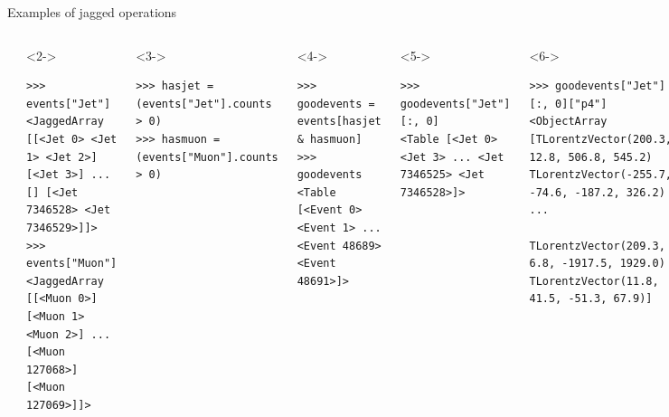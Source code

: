 \documentclass[aspectratio=169]{beamer}
\begin{document}
\begin{frame}[fragile]{Examples of jagged operations}
\scriptsize
\begin{columns}
\begin{verbatim}
>>> events
<Table [<Event 0> <Event 1> ... <Event 99998> <Event 99999>]>
\end{verbatim}
\begin{uncoverenv}<2->
\begin{verbatim}
>>> events["Jet"]
<JaggedArray [[<Jet 0> <Jet 1> <Jet 2>] [<Jet 3>] ... [] [<Jet 7346528> <Jet 7346529>]]>
>>> events["Muon"]
<JaggedArray [[<Muon 0>] [<Muon 1> <Muon 2>] ... [<Muon 127068>] [<Muon 127069>]]>
\end{verbatim}
\end{uncoverenv}
\begin{uncoverenv}<3->
\begin{verbatim}
>>> hasjet = (events["Jet"].counts > 0)
>>> hasmuon = (events["Muon"].counts > 0)
\end{verbatim}
\end{uncoverenv}
\begin{uncoverenv}<4->
\begin{verbatim}
>>> goodevents = events[hasjet & hasmuon]
>>> goodevents
<Table [<Event 0> <Event 1> ... <Event 48689> <Event 48691>]>
\end{verbatim}
\end{uncoverenv}
\begin{uncoverenv}<5->
\begin{verbatim}
>>> goodevents["Jet"][:, 0]
<Table [<Jet 0> <Jet 3> ... <Jet 7346525> <Jet 7346528>]>
\end{verbatim}
\end{uncoverenv}
\begin{uncoverenv}<6->
\begin{verbatim}
>>> goodevents["Jet"][:, 0]["p4"]
<ObjectArray [TLorentzVector(200.3, 12.8, 506.8, 545.2) TLorentzVector(-255.7, -74.6, -187.2, 326.2) ...
              TLorentzVector(209.3, 6.8, -1917.5, 1929.0) TLorentzVector(11.8, 41.5, -51.3, 67.9)]
\end{verbatim}
\end{uncoverenv}
\begin{uncoverenv}<7->
\begin{verbatim}
>>> pairs = goodevents["Jet"]["p4"].cross(goodevents["Muon"]["p4"])
>>> (pairs["0"] + pairs["1"]).mass()
<JaggedArray [[460.79373692 465.34311958 569.06474572] [673.3946112 428.59751399] ...
              [379.91269403 694.82493557]]>
\end{verbatim}
\end{uncoverenv}
\end{columns}
\end{frame}
\end{document}
